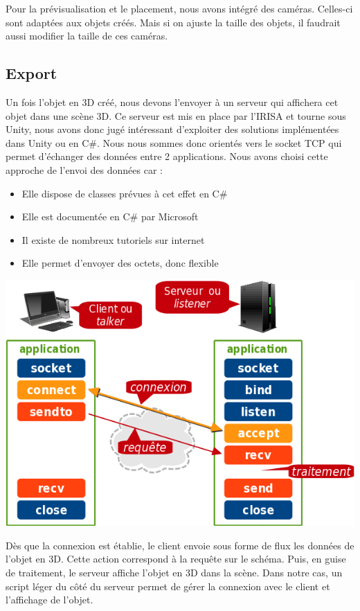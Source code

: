\documentclass[a4paper,11pt]{article}
\begin{document}
			Pour la prévisualisation et le placement, nous avons intégré des caméras. Celles-ci sont adaptées aux objets créés. Mais si on ajuste la taille des objets, il faudrait aussi modifier la taille de ces caméras.

		\subsection{Export} %
			Un fois l'objet en 3D créé, nous devons l'envoyer à un serveur qui affichera cet objet dans une scène 3D.
			Ce serveur est mis en place par l'IRISA et tourne sous Unity, nous avons donc jugé intéressant d'exploiter des solutions implémentées dans Unity ou en C\#.
			Nous nous sommes donc orientés vers le socket TCP qui permet d'échanger des données entre 2 applications.
			Nous avons choisi cette approche de l'envoi des données car :
			\begin{itemize}
				\item Elle dispose de classes prévues à cet effet en C\#
				\item Elle est documentée en C\# par Microsoft\cite{MSDN} 
				\item Il existe de nombreux tutoriels sur internet\cite{CodeProject}
				\item Elle permet d'envoyer des octets, donc flexible
			\end{itemize}
						
			
			\centerline{\includegraphics[scale=1]{images/tcp-socket.png}}
			
			Dès que la connexion est établie, le client envoie sous forme de flux les données de l'objet en 3D. Cette action correspond à la requête sur le schéma. Puis, en guise de traitement, le serveur affiche l'objet en 3D dans la scène.
			Dans notre cas, un script léger du côté du serveur permet de gérer la connexion avec le client et l'affichage de l'objet.
			
\end{document}
